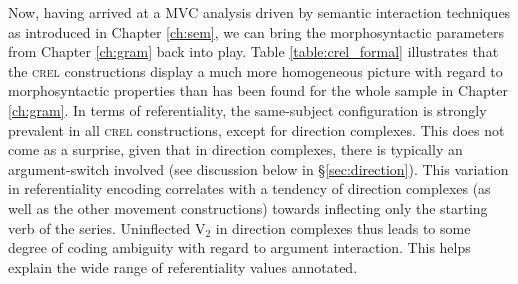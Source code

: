 
Now, having arrived at a MVC analysis driven by semantic interaction techniques as introduced in Chapter \ref{ch:sem}, we can bring the morphosyntactic parameters from Chapter \ref{ch:gram} back into play. Table \ref{table:crel_formal} illustrates that the \textsc{crel} constructions display a much more homogeneous picture with regard to morphosyntactic properties than has been found for the whole sample in Chapter \ref{ch:gram}. In terms of referentiality, the same-subject configuration is strongly prevalent in all \textsc{crel} constructions, except for direction complexes. This does not come as a surprise, given that in direction complexes, there is typically an argument-switch involved (see discussion below in §\ref{sec:direction}). This variation in referentiality encoding correlates with a tendency of direction complexes (as well as the other movement constructions) towards inflecting only the starting verb of the series. Uninflected V$_2$ in direction complexes thus leads to some degree of coding ambiguity with regard to argument interaction. This helps explain the wide range of referentiality values annotated.

